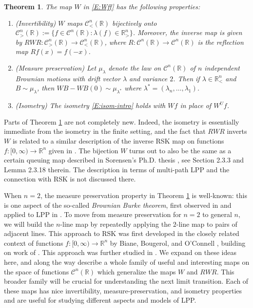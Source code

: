 \documentclass[11pt]{article}
\newcommand{\R}{\mathbb{R}}
\newcommand{\la}{\lambda}
\newcommand{\cC}{\mathcal{C}}
\newtheorem{theorem}{Theorem}[section]
\theoremstyle{definition} %
\theoremstyle{remark} %
\begin{document}
\begin{theorem}
\label{T:RSK-on-CnR-intro}
The map $W$ in \eqref{E:Wff} has the following properties:
\begin{enumerate}
	\item (Invertibility) $W$ maps $\cC^n_<(\R)$ bijectively onto $\cC^n_>(\R) := \{f \in \cC^n(\R) : \la(f) \in \R^n_>\}$. Moreover, the inverse map is given by $RWR:\cC^n_>(\R) \to \cC^n_<(\R)$, where $R:\cC^n(\R) \to \cC^n(\R)$ is the reflection map $Rf(x) = f(-x)$.
	\item (Measure preservation) Let $\mu_\la$ denote the law on $\cC^n(\R)$ of $n$ independent Brownian motions with drift vector $\la$ and variance $2$. Then if $\la \in \R^n_<$ and $B \sim \mu_\la$, then $WB - WB(0) \sim \mu_{\la^*}$ where $\la^* = (\la_n, \dots, \la_1)$.
	\item (Isometry) The isometry \eqref{E:isom-intro} holds with $Wf$ in place of $W^U f$.
\end{enumerate}
\end{theorem}

Parts of Theorem \ref{T:RSK-on-CnR-intro} are not completely new. Indeed, the isometry is essentially immediate from the isometry in the finite setting, and the fact that $RWR$ inverts $W$ is related to a similar description of the inverse RSK map on functions $f:[0, \infty) \to \R^n$ given in \cite{dauvergne2022rsk}.
The bijection $W$ turns out to also be the same as a certain queuing map described in Sorensen's Ph.D. thesis \cite{sorensen2023stationary}, see Section 2.3.3 and Lemma 2.3.18 therein. The description in terms of multi-path LPP and the connection with RSK is not discussed there.

When $n = 2$, the measure preservation property in Theorem \ref{T:RSK-on-CnR-intro} is well-known: this is one aspect of the so-called \textit{Brownian Burke theorem}, first observed in \cite{harrison1990quasireversibility} and applied to LPP in \cite{o2001brownian}. To move from measure preservation for $n=2$ to general $n$, we will build the $n$-line map by repeatedly applying the $2$-line map to pairs of adjacent lines. This approach to RSK was first developed in the closely related context of functions $f:[0, \infty) \to \R^n$ by Biane, Bougerol, and O'Connell \cite{biane2005littelmann}, building on work of \cite{o2001brownian, o2002representation, o2003path}. This approach was further studied in \cite{DOV, dauvergne2022rsk}. We expand on these ideas here, and along the way describe a whole family of useful and interesting maps on the space of functions $\cC^n(\R)$ which generalize the maps $W$ and $RWR$. This broader family will be crucial for understanding the next limit transition. Each of these maps has nice invertibility, measure-preservation, and isometry properties and are useful for studying different aspects and models of LPP.
\end{document}
